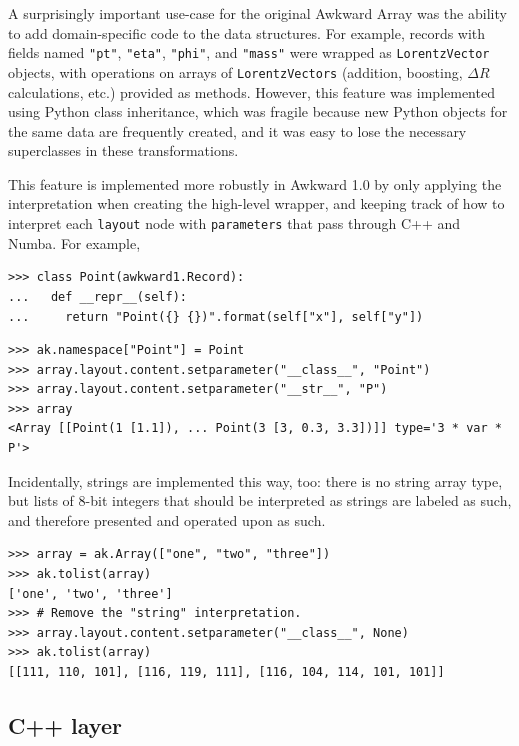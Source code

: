 \documentclass{webofc}
\begin{document}
A surprisingly important use-case for the original Awkward Array was the ability to add domain-specific code to the data structures. For example, records with fields named \texttt{"pt"}, \texttt{"eta"}, \texttt{"phi"}, and \texttt{"mass"} were wrapped as \texttt{LorentzVector} objects, with operations on arrays of \texttt{LorentzVectors} (addition, boosting, $\Delta R$ calculations, etc.) provided as methods. However, this feature was implemented using Python class inheritance, which was fragile because new Python objects for the same data are frequently created, and it was easy to lose the necessary superclasses in these transformations.

This feature is implemented more robustly in Awkward 1.0 by only applying the interpretation when creating the high-level wrapper, and keeping track of how to interpret each \texttt{layout} node with \texttt{parameters} that pass through C++ and Numba. For example,

\begin{verbatim}
>>> class Point(awkward1.Record):
...   def __repr__(self):
...     return "Point({} {})".format(self["x"], self["y"])
\end{verbatim}

\begin{verbatim}
>>> ak.namespace["Point"] = Point
>>> array.layout.content.setparameter("__class__", "Point")
>>> array.layout.content.setparameter("__str__", "P")
>>> array
<Array [[Point(1 [1.1]), ... Point(3 [3, 0.3, 3.3])]] type='3 * var * P'>
\end{verbatim}

\noindent Incidentally, strings are implemented this way, too: there is no string array type, but lists of 8-bit integers that should be interpreted as strings are labeled as such, and therefore presented and operated upon as such.

\begin{verbatim}
>>> array = ak.Array(["one", "two", "three"])
>>> ak.tolist(array)
['one', 'two', 'three']
>>> # Remove the "string" interpretation.
>>> array.layout.content.setparameter("__class__", None)
>>> ak.tolist(array)
[[111, 110, 101], [116, 119, 111], [116, 104, 114, 101, 101]]
\end{verbatim}

\subsection{C++ layer}
\end{document}
